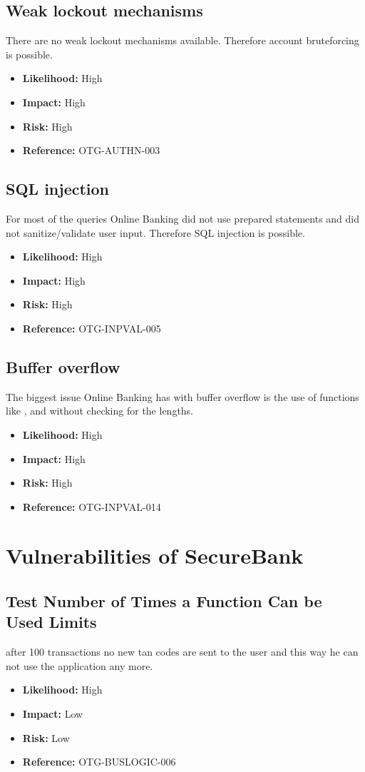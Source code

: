 \subsection{Weak lockout mechanisms}
There are no weak lockout mechanisms available. Therefore account bruteforcing is possible.
\begin{itemize}
	\item \textbf{Likelihood:} High
	\item \textbf{Impact:} High
	\item \textbf{Risk:} High
	\item \textbf{Reference:} OTG-AUTHN-003
\end{itemize}

\subsection{SQL injection}
For most of the queries Online Banking did not use prepared statements and did not sanitize/validate user input. Therefore SQL injection is possible.
\begin{itemize}
	\item \textbf{Likelihood:} High
	\item \textbf{Impact:} High
	\item \textbf{Risk:} High
	\item \textbf{Reference:} OTG-INPVAL-005
\end{itemize}

\subsection{Buffer overflow}
The biggest issue Online Banking has with buffer overflow is the use of functions like ,  and  without checking for the lengths.
\begin{itemize}
	\item \textbf{Likelihood:} High
	\item \textbf{Impact:} High
	\item \textbf{Risk:} High
	\item \textbf{Reference:} OTG-INPVAL-014
\end{itemize}

\section{Vulnerabilities of SecureBank}

\subsection{Test Number of Times a Function Can be Used Limits}
after 100 transactions no new tan codes are sent to the user and this way he can not use the application any more.\\
\begin{itemize}
	\item \textbf{Likelihood:} High
	\item \textbf{Impact:} Low
	\item \textbf{Risk:} Low
	\item \textbf{Reference:} OTG-BUSLOGIC-006
\end{itemize}
